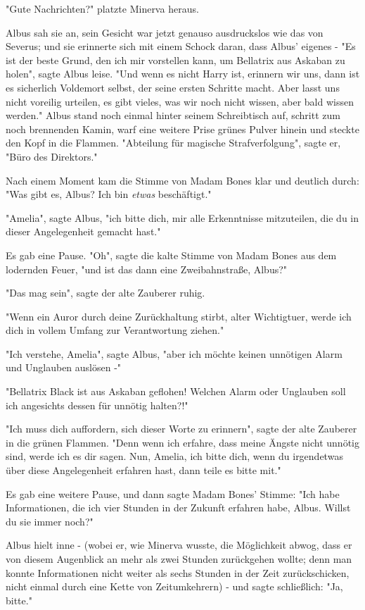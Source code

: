 {"Gute Nachrichten?" platzte Minerva heraus.

Albus sah sie an, sein Gesicht war jetzt genauso ausdruckslos wie das von Severus; und sie erinnerte sich mit einem Schock daran, dass Albus' eigenes - "Es ist der beste Grund, den ich mir vorstellen kann, um Bellatrix aus Askaban zu holen", sagte Albus leise. "Und wenn es nicht Harry ist, erinnern wir uns, dann ist es sicherlich Voldemort selbst, der seine ersten Schritte macht. Aber lasst uns nicht voreilig urteilen, es gibt vieles, was wir noch nicht wissen, aber bald wissen werden." Albus stand noch einmal hinter seinem Schreibtisch auf, schritt zum noch brennenden Kamin, warf eine weitere Prise grünes Pulver hinein und steckte den Kopf in die Flammen. "Abteilung für magische Strafverfolgung", sagte er, "Büro des Direktors."

Nach einem Moment kam die Stimme von Madam Bones klar und deutlich durch: "Was gibt es, Albus? Ich bin \emph{etwas} beschäftigt."

"Amelia", sagte Albus, "ich bitte dich, mir alle Erkenntnisse mitzuteilen, die du in dieser Angelegenheit gemacht hast."

Es gab eine Pause. "Oh", sagte die kalte Stimme von Madam Bones aus dem lodernden Feuer, "und ist das dann eine Zweibahnstraße, Albus?"

"Das mag sein", sagte der alte Zauberer ruhig.

"Wenn ein Auror durch deine Zurückhaltung stirbt, alter Wichtigtuer, werde ich dich in vollem Umfang zur Verantwortung ziehen."

"Ich verstehe, Amelia", sagte Albus, "aber ich möchte keinen unnötigen Alarm und Unglauben auslösen -"

"Bellatrix Black ist aus Askaban geflohen! Welchen Alarm oder Unglauben soll ich angesichts dessen für unnötig halten?!"

"Ich muss dich auffordern, sich dieser Worte zu erinnern", sagte der alte Zauberer in die grünen Flammen. "Denn wenn ich erfahre, dass meine Ängste nicht unnötig sind, werde ich es dir sagen. Nun, Amelia, ich bitte dich, wenn du irgendetwas über diese Angelegenheit erfahren hast, dann teile es bitte mit."

Es gab eine weitere Pause, und dann sagte Madam Bones' Stimme: "Ich habe Informationen, die ich vier Stunden in der Zukunft erfahren habe, Albus. Willst du sie immer noch?"

Albus hielt inne - (wobei er, wie Minerva wusste, die Möglichkeit abwog, dass er von diesem Augenblick an mehr als zwei Stunden zurückgehen wollte; denn man konnte Informationen nicht weiter als sechs Stunden in der Zeit zurückschicken, nicht einmal durch eine Kette von Zeitumkehrern) - und sagte schließlich: "Ja, bitte."

}
